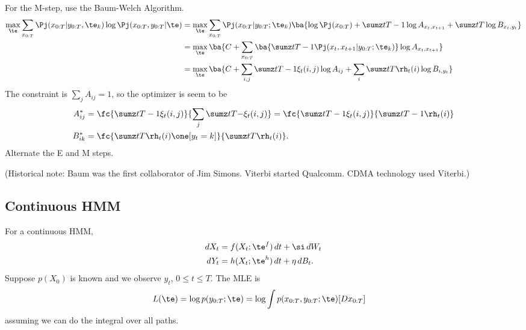 For the M-step, use the Baum-Welch Algorithm. 
\begin{align}
\max_\te \sum_{x_{0:T}}
\Pj(x_{0:T}|y_{0:T}, \te_k) 
\log\Pj(x_{0:T},y_{0:T}|\te)
&=
\max_\te \sum_{x_{0:T}}
\Pj(x_{0:T}|y_{0:T}; \te_k) 
\ba{
\log\Pj(x_{0:T})
+ \sumz t{T-1} \log A_{x_t,x_{t+1}}
+ \sumz t{T} \log B_{x_t,y_t}
}\\
&=\max_\te\ba{
C + \sum_{x_{0:T}}
\ba{
\sumz t{T-1} \Pj(x_t,x_{t+1}|y_{0:T};\te_k)
}\log A_{x_t,x_{t+1}}}\\
&=\max_\te\ba{
C+\sum_{i,j}\sumz t{T-1}
\xi_t(i,j) \log A_{ij}
+ \sum_i \sumz tT \rh_t(i) \log B_{i,y_t}
}
\end{align}
The constraint is $\sum_j A_{ij}=1$, so the optimizer is seem to be
\begin{align}
A_{ij}^* &=
\fc{\sumz t{T-1} \xi_t(i,j)}{\sum_j \sumz t{T-}\xi_t(i,j)}
=\fc{\sumz t{T-1} \xi_t(i,j)}{\sumz t{T-1} \rh_t(i)}\\
B_{ik}^* &=\fc{\sumz tT \rh_t(i) \one[y_t=k]}{\sumz tT \rh_t(i)}.
\end{align}
Alternate the E and M steps.


(Historical note: Baum was the first collaborator of Jim Simons. Viterbi started Qualcomm. CDMA technology used Viterbi.)


\subsection{Continuous HMM}

For a continuous HMM,
\begin{align}
dX_t &= f(X_t;\te^f)\,dt + \si\,dW_t\\
dY_t &= h(X_t;\te^h)\,dt + \eta\,dB_t.
\end{align}
Suppose $p(X_0)$ is known  and we observe $y_t$, $0\le t\le T$. The MLE is
\begin{align}
L(\te) &= \log p(y_{0:T};\te)
=\log \int p(x_{0:T}, y_{0:T};\te)[Dx_{0:T}]
\end{align}
assuming we can do the integral over all paths.

